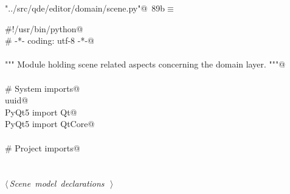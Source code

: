 \documentclass[
    a4paper,      %
    10pt,         %
    openright,    %
    notitlepage,  %
    parskip=half, %
]{scrreprt}       %
\theoremstyle{definition}                    %
\begin{document}
\begin{flushleft} \small
\begin{minipage}{\linewidth}\label{scrap141}\raggedright\small
{} \verb@"../src/qde/editor/domain/scene.py"@\nobreak\ {\footnotesize {89b}}$\equiv$
\vspace{-1ex}
\begin{list}{}{} \item
\mbox{}\lstinline@#!/usr/bin/python@\\
\mbox{}\lstinline@# -*- coding: utf-8 -*-@\\
\mbox{}\lstinline@@\\
\mbox{}\lstinline@""" Module holding scene related aspects concerning the domain layer. """@\\
\mbox{}\lstinline@@\\
\mbox{}\lstinline@# System imports@\\
\mbox{}\lstinline@import uuid@\\
\mbox{}\lstinline@from PyQt5 import Qt@\\
\mbox{}\lstinline@from PyQt5 import QtCore@\\
\mbox{}\lstinline@@\\
\mbox{}\lstinline@# Project imports@\\
\mbox{}\lstinline@@\\
\mbox{}\lstinline@@\\
\mbox{}\lstinline@@\hbox{$\langle\,${\itshape Scene model declarations}\nobreak\ {\footnotesize {}}$\,\rangle$}\lstinline@@\\
\mbox{}\lstinline@@{\NWsep}
\end{list}
\vspace{-1.5ex}
\footnotesize
\begin{list}{}{\setlength{\itemsep}{-\parsep}\setlength{\itemindent}{-\leftmargin}}

\item{}
\end{list}
\end{minipage}\vspace{4ex}
\end{flushleft}
\end{document}
